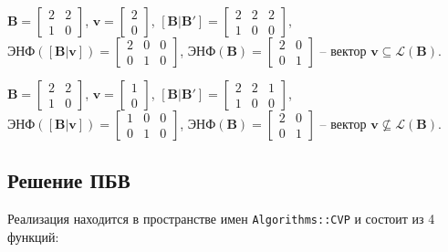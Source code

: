 $ \mathbf{B} = \left[\begin{array}{cccc}
2 & 2 \\
1 & 0
\end{array}\right] $, 
$ \mathbf{v} = \left[\begin{array}{cccc}
2 \\
0
\end{array}\right] $, 
$ \left[\mathbf{B} | \mathbf{B}'\right] = \left[\begin{array}{cccc}
2 & 2 & 2 \\
1 & 0 & 0
\end{array}\right] $, 
$ \text{ЭНФ}(\left[\mathbf{B} | \mathbf{v} \right]) = \left[\begin{array}{cccc}
2 & 0 & 0 \\
0 & 1 & 0
\end{array}\right] $,
$ \text{ЭНФ}(\mathbf{B}) = \left[\begin{array}{cccc}
2 & 0 \\
0 & 1
\end{array}\right] $ -- вектор $ \mathbf{v} \subseteq \mathcal{L}(\mathbf{B}) $.


$ \mathbf{B} = \left[\begin{array}{cccc}
2 & 2 \\
1 & 0
\end{array}\right] $, 
$ \mathbf{v} = \left[\begin{array}{cccc}
1 \\
0
\end{array}\right] $, 
$ \left[\mathbf{B} | \mathbf{B}'\right] = \left[\begin{array}{cccc}
2 & 2 & 1 \\
1 & 0 & 0
\end{array}\right] $, 
$ \text{ЭНФ}(\left[\mathbf{B} | \mathbf{v} \right]) = \left[\begin{array}{cccc}
1 & 0 & 0 \\
0 & 1 & 0
\end{array}\right] $,
$ \text{ЭНФ}(\mathbf{B}) = \left[\begin{array}{cccc}
2 & 0 \\
0 & 1
\end{array}\right] $ -- вектор $ \mathbf{v} \not \subseteq \mathcal{L}(\mathbf{B}) $.

\subsection{Решение ПБВ}

Реализация находится в пространстве имен \verb!Algorithms::CVP! и состоит из 4 функций:

